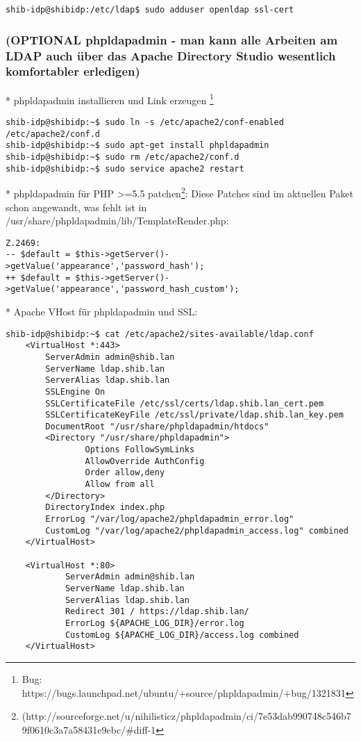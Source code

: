 \begin{lstlisting}
shib-idp@shibidp:/etc/ldap$ sudo adduser openldap ssl-cert
\end{lstlisting}

\subsubsection*{(OPTIONAL phpldapadmin - man kann alle Arbeiten am LDAP auch
über das Apache Directory Studio wesentlich komfortabler erledigen)} * phpldapadmin installieren und Link erzeugen \footnote{Bug:
https://bugs.launchpad.net/ubuntu/+source/phpldapadmin/+bug/1321831}
\begin{lstlisting}		
shib-idp@shibidp:~$ sudo ln -s /etc/apache2/conf-enabled /etc/apache2/conf.d
shib-idp@shibidp:~$ sudo apt-get install phpldapadmin
shib-idp@shibidp:~$ sudo rm /etc/apache2/conf.d
shib-idp@shibidp:~$ sudo service apache2 restart
\end{lstlisting}
* phpldapadmin für PHP >=5.5 patchen\footnote{
(http://sourceforge.net/u/nihilisticz/phpldapadmin/ci/7e53dab990748c546b79f0610c3a7a58431e9ebc/\#diff-1}:\newline
Diese Patches sind im aktuellen Paket schon angewandt, was fehlt ist
in /usr/share/phpldapadmin/lib/TemplateRender.php:
\begin{lstlisting}
Z.2469: 
-- $default = $this->getServer()->getValue('appearance','password_hash'); 
++ $default = $this->getServer()->getValue('appearance','password_hash_custom');
\end{lstlisting}
		
* Apache VHost für phpldapadmin und SSL:
\begin{lstlisting}
shib-idp@shibidp:~$ cat /etc/apache2/sites-available/ldap.conf 
	<VirtualHost *:443>
		ServerAdmin admin@shib.lan
		ServerName ldap.shib.lan
		ServerAlias ldap.shib.lan
		SSLEngine On
		SSLCertificateFile /etc/ssl/certs/ldap.shib.lan_cert.pem
		SSLCertificateKeyFile /etc/ssl/private/ldap.shib.lan_key.pem
		DocumentRoot "/usr/share/phpldapadmin/htdocs"
		<Directory "/usr/share/phpldapadmin">
				Options FollowSymLinks
				AllowOverride AuthConfig
				Order allow,deny
				Allow from all
		</Directory>
		DirectoryIndex index.php
		ErrorLog "/var/log/apache2/phpldapadmin_error.log"
		CustomLog "/var/log/apache2/phpldapadmin_access.log" combined
	</VirtualHost>		
	
	<VirtualHost *:80>
			ServerAdmin admin@shib.lan
			ServerName ldap.shib.lan
			ServerAlias ldap.shib.lan 
			Redirect 301 / https://ldap.shib.lan/
			ErrorLog ${APACHE_LOG_DIR}/error.log
			CustomLog ${APACHE_LOG_DIR}/access.log combined
	</VirtualHost>
\end{lstlisting}
		
